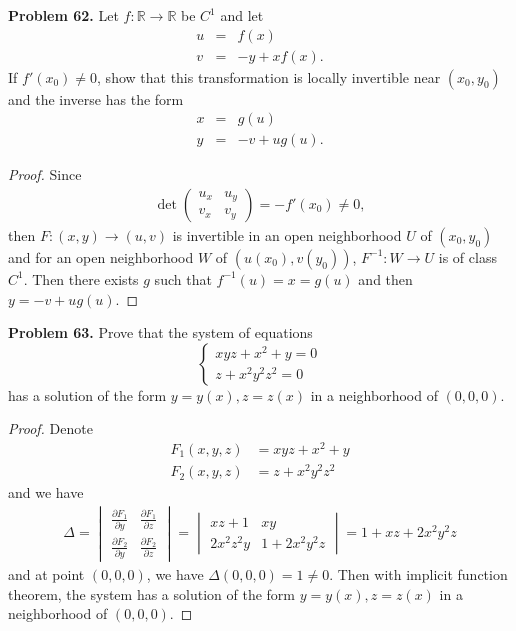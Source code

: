 \documentclass[12pt,leqno]{amsart}
\theoremstyle{definition}
\begin{document}
\noindent
{\bf Problem 62.}
Let $f:\mathbb{R}\to\mathbb{R}$ be $C^1$ and let
\begin{eqnarray*}
u & = & f(x) \\
v & = & -y+xf(x).
\end{eqnarray*}
If $f'(x_0)\neq 0$, show that this transformation is locally
invertible near $(x_0,y_0)$ and the inverse has the form
\begin{eqnarray*}
x & = & g(u) \\
y & = & -v+ug(u).
\end{eqnarray*}
\begin{proof}
Since 
\begin{align*}
    \det \begin{pmatrix}
        u_x & u_y \\
        v_x & v_y
    \end{pmatrix} = - f'(x_0) \neq 0,
\end{align*}
then $F: (x,y) \to (u,v)$ is invertible in an open neighborhood $U$ of $(x_0,y_0)$ and for an open neighborhood $W$ of $(u(x_0),v(y_0))$, $F^{-1}: W\to U$ is of class $C^1$. Then there exists $g$ such that $f^{-1}(u) = x = g(u)$ and then $y = -v + ug(u)$.
\end{proof}

\medskip

\noindent
{\bf Problem 63.}
Prove that the system of equations
$$
\begin{cases}
xyz+x^2+y = 0\\
z+x^2y^2z^2 = 0
\end{cases}
$$
has a solution of the form $y=y(x), z=z(x)$ in a neighborhood of
$(0,0,0)$.
\begin{proof}
Denote 
\begin{align*}
    F_1(x,y,z) & = xyz + x^2 + y \\
    F_2(x,y,z) & = z + x^2y^2z^2
\end{align*}
and we have
\begin{align*}
    \Delta = \begin{vmatrix}
        \frac{\partial F_1}{\partial y} & \frac{\partial F_1}{\partial z} \\
        \frac{\partial F_2}{\partial y} & \frac{\partial F_2}{\partial z}
    \end{vmatrix} = \begin{vmatrix}
        xz + 1 & xy \\
        2 x^2 z^2 y & 1 + 2 x^2 y^2 z
    \end{vmatrix} = 1 + xz + 2 x^2 y^2 z
\end{align*}
and at point $(0,0,0)$, we have $\Delta(0,0,0) = 1 \neq 0$. Then with implicit function theorem, the system has a solution of the form $y=y(x), z=z(x)$ in a neighborhood of
$(0,0,0)$.
\end{proof}
\end{document}
